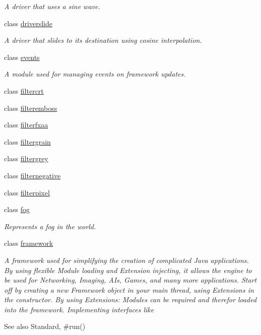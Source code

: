 \begin{DoxyCompactItemize}
\begin{DoxyCompactList}\small\item\em A driver that uses a sine wave. \end{DoxyCompactList}\item 
class \hyperlink{classflounder_1_1driverslide}{driverslide}
\begin{DoxyCompactList}\small\item\em A driver that slides to its destination using cosine interpolation. \end{DoxyCompactList}\item 
class \hyperlink{classflounder_1_1events}{events}
\begin{DoxyCompactList}\small\item\em A module used for managing events on framework updates. \end{DoxyCompactList}\item 
class \hyperlink{classflounder_1_1filtercrt}{filtercrt}
\item 
class \hyperlink{classflounder_1_1filteremboss}{filteremboss}
\item 
class \hyperlink{classflounder_1_1filterfxaa}{filterfxaa}
\item 
class \hyperlink{classflounder_1_1filtergrain}{filtergrain}
\item 
class \hyperlink{classflounder_1_1filtergrey}{filtergrey}
\item 
class \hyperlink{classflounder_1_1filternegative}{filternegative}
\item 
class \hyperlink{classflounder_1_1filterpixel}{filterpixel}
\item 
class \hyperlink{classflounder_1_1fog}{fog}
\begin{DoxyCompactList}\small\item\em Represents a fog in the world. \end{DoxyCompactList}\item 
class \hyperlink{classflounder_1_1framework}{framework}
\begin{DoxyCompactList}\small\item\em A framework used for simplifying the creation of complicated Java applications. By using flexible Module loading and Extension injecting, it allows the engine to be used for Networking, Imaging, A\+Is, Games, and many more applications. Start off by creating a new Framework object in your main thread, using Extensions in the constructor. By using Extensions\+: Modules can be required and therefor loaded into the framework. Implementing interfaces like \begin{DoxySeeAlso}{See also}
Standard, \#run()



\end{DoxySeeAlso}
\end{DoxyCompactList}
\end{DoxyCompactItemize}
